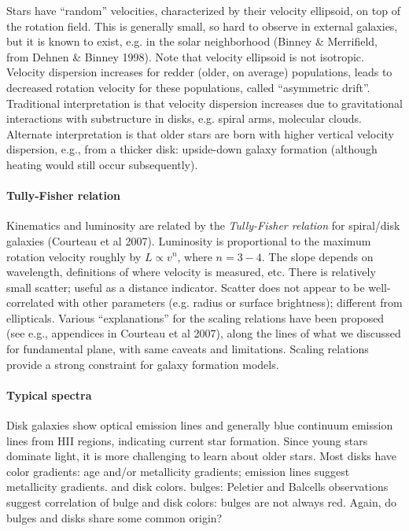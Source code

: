 \documentclass{article}
\begin{document}
Stars have ``random'' velocities, characterized by their velocity ellipsoid, on
top of the rotation field. This is generally small, so hard to observe in
external galaxies, but it is known to exist, e.g. in the solar neighborhood
(Binney \& Merrifield, from Dehnen \& Binney 1998). Note that velocity
ellipsoid is not isotropic. Velocity dispersion increases for redder (older, on
average) populations, leads to decreased rotation velocity for these
populations, called ``asymmetric drift''. Traditional interpretation is that
velocity dispersion increases due to gravitational interactions with
substructure in disks, e.g. spiral arms, molecular clouds. Alternate
interpretation is that older stars are born with higher vertical velocity
dispersion, e.g., from a thicker disk: upside-down galaxy formation (although
heating would still occur subsequently).

\paragraph{Tully-Fisher relation}
Kinematics and luminosity are related by the \textit{Tully-Fisher relation} for
spiral/disk galaxies (Courteau et al 2007). Luminosity is proportional to the
maximum rotation velocity roughly by $ L \propto v^{n}$, where $n = 3 - 4$. The
slope depends on wavelength, definitions of where velocity is measured, etc.
There is relatively small scatter; useful as a distance indicator.
Scatter does not appear to be well-correlated with other parameters
(e.g. radius or surface brightness); different from ellipticals.
Various ``explanations'' for the scaling relations have been proposed
(see e.g., appendices in Courteau et al 2007), along the lines of what
we discussed for fundamental plane, with same caveats and limitations.
Scaling relations provide a strong constraint for galaxy formation models.

\paragraph{Typical spectra}
Disk galaxies show optical emission lines and generally blue continuum emission
lines from HII regions, indicating current star formation. Since young stars
dominate light, it is more challenging to learn about older stars. Most disks
have color gradients: age and/or metallicity gradients; emission lines suggest
metallicity gradients. and disk colors. bulges: Peletier and Balcells
observations suggest correlation of bulge and disk colors: bulges are not
always red. Again, do bulges and disks share some common origin?
\end{document}
